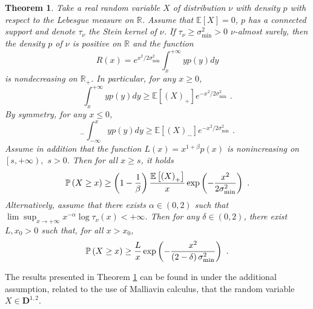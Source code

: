 \documentclass[11pt]{article}
\newtheorem{theorem}{Theorem}
\begin{document}
\begin{theorem}
\label{prop_kernel_lower_bound}Take a real random variable $X$ of
distribution $\nu $ with density $p$ with respect to the Lebesgue measure on 
$\mathbb{R}$. Assume that $\mathbb{E}\left[ X\right] =0$, $p$ has a
connected support and denote $\tau _{\nu }$ the Stein kernel of $\nu $. If $%
\tau _{\nu }\geq \sigma _{\min }^{2}>0$ $\nu $-almost surely, then the
density $p$ of $\nu $ is positive on $\mathbb{R}$ and the function%
\begin{equation*}
R\left( x\right) =e^{x^{2}/2\sigma _{\min }^{2}}\int_{x}^{+\infty }yp\left(
y\right) dy
\end{equation*}%
is nondecreasing on $\mathbb{R}_{+}$. In particular, for any $x\geq 0$,%
\begin{equation}
\int_{x}^{+\infty }yp\left( y\right) dy\geq \mathbb{E}\left[ (X)_{+}\right]
e^{-x^{2}/2\sigma _{\min }^{2}}\text{ .}  \label{mino_tail_unif}
\end{equation}%
By symmetry, for any $x\leq 0$,%
\begin{equation}
_{-}\int_{-\infty }^{x}yp\left( y\right) dy\geq \mathbb{E}\left[ (X)_{-}%
\right] e^{-x^{2}/2\sigma _{\min }^{2}}\text{ .}  \label{mino_tail_unif_left}
\end{equation}%
Assume in addition that the function $L\left( x\right) =x^{1+\beta }p\left(
x\right) $ is nonincreasing on $\left[ s,+\infty \right) ,$ $s>0$. Then for
all $x\geq s$, it holds%
\begin{equation}
\mathbb{P}\left( X\geq x\right) \geq \left( 1-\frac{1}{\beta }\right) \frac{%
\mathbb{E}\left[ \left( X\right) _{+}\right] }{x}\exp \left( -\frac{x^{2}}{%
2\sigma _{\min }^{2}}\right) \text{ .}  \label{mino_tail_poly}
\end{equation}%
Alternatively, assume that there exists $\alpha \in \left( 0,2\right) $ such
that $\lim \sup_{x\rightarrow +\infty }x^{-\alpha }\log \tau _{\nu }\left(
x\right) <+\infty $. Then for any $\delta \in \left( 0,2\right) $, there
exist $L,x_{0}>0$ such that, for all $x>x_{0}$,%
\begin{equation}
\mathbb{P}\left( X\geq x\right) \geq \frac{L}{x}\exp \left( -\frac{x^{2}}{%
\left( 2-\delta \right) \sigma _{\min }^{2}}\right) \text{ .}
\label{mino_tail_limsup}
\end{equation}
\end{theorem}

The results presented in Theorem \ref{prop_kernel_lower_bound} can be found
in \cite{MR2556018} under the additional assumption, related to the use of
Malliavin calculus, that the random variable $X\in \mathbf{D}^{1,2}$.
\end{document}
